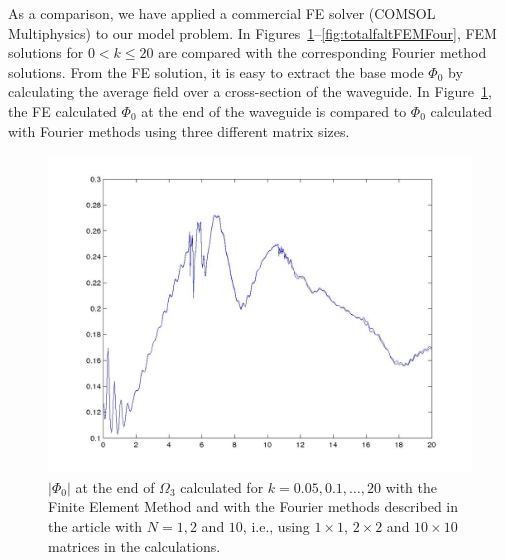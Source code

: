 \documentclass[numreferences]{kluwer}
\providecommand{\abs}[1]{\left\lvert#1\right\rvert}
\renewcommand{\Phi}{\varPhi}
\renewcommand{\Phi}{\varPhi}
\begin{document}
As a comparison, we have applied a commercial FE solver (COMSOL
Multiphysics) to our model problem. In
Figures~\ref{fig:FEMvsFourier}--\ref{fig:totalfaltFEMFour}, FEM
solutions for $0<k\le20$ are compared with the corresponding Fourier
method solutions. From the FE solution, it is easy to extract the base
mode $\Phi_0$ by calculating the average field over a cross-section
of the waveguide. In Figure~\ref{fig:FEMvsFourier}, the FE calculated
$\Phi_0$ at the end of the waveguide is compared to $\Phi_0$
calculated with Fourier methods using three different matrix sizes. 
\begin{figure}[htb]
  \centering
  \includegraphics[width=\linewidth]{FEMvsFourier}
  \caption{$\abs{\Phi_{0}}$ at the end of $\Omega_3$ calculated for
    $k=0.05,0.1,\dots,20$ with the Finite Element Method and with the
    Fourier methods described in the article with $N=1,2$ and $10$,
    i.e., using $1\times1$, $2\times2$ and $10\times10$ matrices in
    the calculations.}
  \label{fig:FEMvsFourier}
\end{figure}
\end{document}
